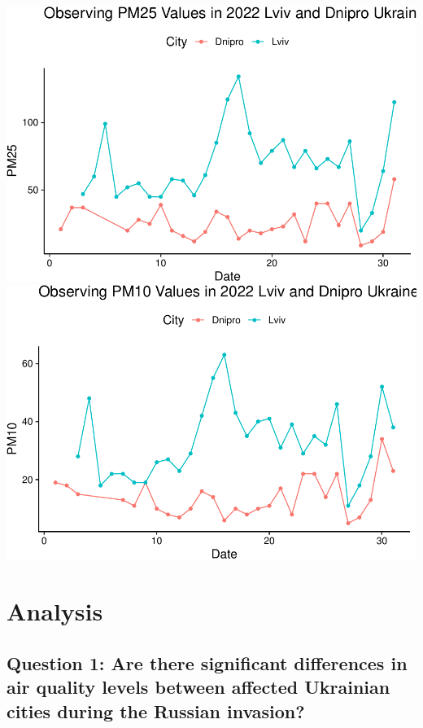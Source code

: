 \documentclass[
  12pt,
]{article}
\begin{document}
\includegraphics{Fontanie_Gordon_Weinberg_Project_files/figure-latex/Plotting Lviv vs Dnipro-1.pdf}
\includegraphics{Fontanie_Gordon_Weinberg_Project_files/figure-latex/Plotting Lviv vs Dnipro-2.pdf}

\newpage

\hypertarget{analysis}{%
\section{Analysis}\label{analysis}}

\hypertarget{question-1-are-there-significant-differences-in-air-quality-levels-between-affected-ukrainian-cities-during-the-russian-invasion}{%
\subsection{Question 1: Are there significant differences in air quality
levels between affected Ukrainian cities during the Russian
invasion?}\label{question-1-are-there-significant-differences-in-air-quality-levels-between-affected-ukrainian-cities-during-the-russian-invasion}}
\end{document}
